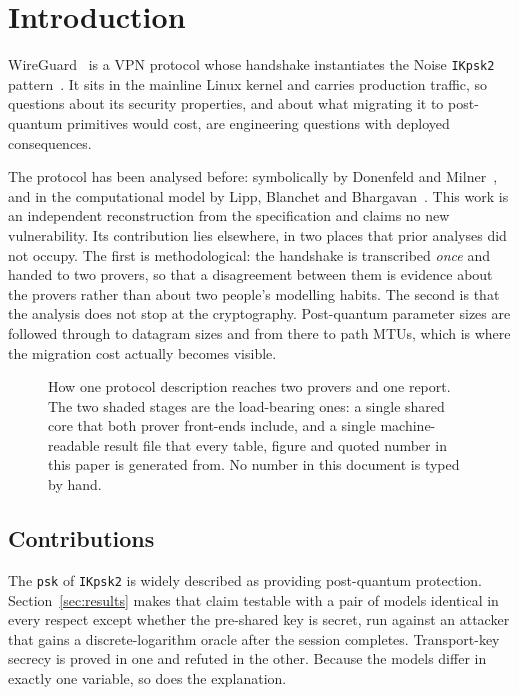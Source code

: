 \section{Introduction}
\label{sec:intro}

WireGuard~\cite{donenfeld2017wireguard} is a VPN protocol whose handshake
instantiates the Noise \texttt{IKpsk2} pattern~\cite{perrin2018noise}. It sits
in the mainline Linux kernel and carries production traffic, so questions
about its security properties, and about what migrating it to post-quantum
primitives would cost, are engineering questions with deployed consequences.

The protocol has been analysed before: symbolically by Donenfeld and
Milner~\cite{donenfeld2018formal}, and in the computational model by Lipp,
Blanchet and Bhargavan~\cite{lipp2019cryptoverif}. This work is an independent
reconstruction from the specification and claims no new vulnerability. Its
contribution lies elsewhere, in two places that prior analyses did not
occupy. The first is methodological: the handshake is transcribed \emph{once}
and handed to two provers, so that a disagreement between them is evidence
about the provers rather than about two people's modelling habits. The second
is that the analysis does not stop at the cryptography. Post-quantum
parameter sizes are followed through to datagram sizes and from there to path
MTUs, which is where the migration cost actually becomes visible.

\begin{figure}[t]
\centering
\resizebox{\textwidth}{!}{}
\caption{How one protocol description reaches two provers and one report.
The two shaded stages are the load-bearing ones: a single shared core that
both prover front-ends include, and a single machine-readable result file that
every table, figure and quoted number in this paper is generated from. No
number in this document is typed by hand.}
\label{fig:pipeline}
\end{figure}

\subsection{Contributions}

 The \texttt{psk}
of \texttt{IKpsk2} is widely described as providing post-quantum protection.
Section~\ref{sec:results} makes that claim testable with a pair of models
identical in every respect except whether the pre-shared key is secret, run
against an attacker that gains a discrete-logarithm oracle after the session
completes. Transport-key secrecy is proved in one and refuted in the other.
Because the models differ in exactly one variable, so does the explanation.

